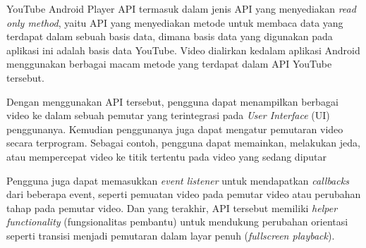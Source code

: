 	YouTube Android Player API termasuk dalam jenis API yang menyediakan \textit{read only method}, yaitu API yang menyediakan metode untuk membaca data yang terdapat dalam sebuah basis data, dimana basis data yang digunakan pada aplikasi ini adalah basis data YouTube. Video dialirkan kedalam aplikasi Android menggunakan berbagai macam metode yang terdapat dalam API YouTube tersebut. 
	
	Dengan menggunakan API tersebut, pengguna dapat menampilkan berbagai video ke dalam sebuah pemutar yang terintegrasi pada \emph{User Interface} (UI) penggunanya. Kemudian penggunanya juga dapat mengatur pemutaran video secara terprogram. Sebagai contoh, pengguna dapat memainkan, melakukan jeda, atau mempercepat video ke titik tertentu pada video yang sedang diputar
	
	Pengguna juga dapat memasukkan \emph{event listener} untuk mendapatkan \emph{callbacks} dari beberapa event, seperti pemuatan video pada pemutar video atau perubahan tahap pada pemutar video. Dan yang terakhir, API tersebut memiliki \emph{helper functionality} (fungsionalitas pembantu) untuk mendukung perubahan orientasi seperti transisi menjadi pemutaran dalam layar penuh (\emph{fullscreen playback}).
	
